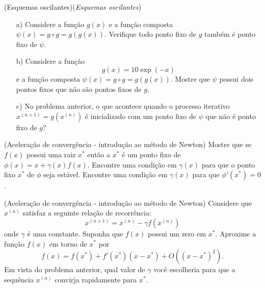 \begin{ex}
\begin{exer}(Esquemas oscilantes)(\textit{Esquemas oscilantes})
\begin{itemize}
\item[a)] Considere a função $g(x)$ e a função composta $\psi(x)=g\circ g=g\left(g(x)\right)$. Verifique todo ponto fixo de $g$ também é ponto fixo de $\psi$.

\item[b)]  Considere a função \begin{equation} g(x)=10\exp(-x) \end{equation} e a função composta $\psi(x)=g\circ g=g\left(g(x)\right)$. Mostre que $\psi$ possui dois pontos fixos que não são pontos fixos de $g$.

\item[c)]  No problema anterior, o que acontece quando o processo iterativo $x^{(n+1)}=g(x^{(n)})$ é inicializado com um ponto fixo de $\psi$ que não é ponto fixo de $g$?
\end{itemize}
\end{exer}

\begin{exer}(Aceleração de convergência - introdução ao método de Newton)\label{int_new1} Mostre que se $f(x)$ possui uma raiz $x^*$ então a $x^*$ é um ponto fixo de $\phi(x)=x+\gamma(x) f(x)$. Encontre uma condição em $\gamma(x)$ para que o ponto fixo $x^*$ de $\phi$ seja estável. Encontre uma condição em $\gamma(x)$ para que $\phi'(x^*)=0$.
\end{exer}

\begin{exer}(Aceleração de convergência - introdução ao método de Newton)\label{int_new2} Considere que $x^{(n)}$ satisfaz a seguinte relação de recorrência:
\begin{equation} x^{(n+1)}=x^{(n)} - \gamma f(x^{(n)}) \end{equation}
onde $\gamma$ é uma constante. Suponha que $f(x)$ possui um zero em $x^*$. Aproxime a função $f(x)$ em torno de $x^*$ por
\begin{equation} f(x)=f(x^*)+f'(x^*)(x-x^*)+O\left((x-x^*)^2\right). \end{equation}
Em vista do problema anterior, qual valor de $\gamma$ você escolheria para que a sequência $x^{(n)}$ convirja rapidamente para $x^*$.
\end{exer}


\end{ex}
